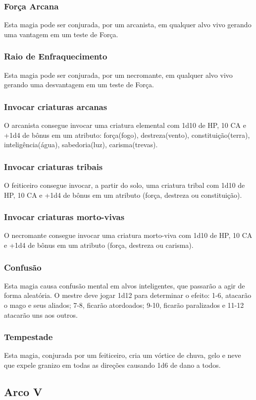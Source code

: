 \documentclass[10pt,twoside,twocolumn]{book}
\begin{document}
\subsubsection*{Força Arcana}
Esta magia pode ser conjurada, por um arcanista, em qualquer alvo vivo gerando uma vantagem em um teste de Força.
\subsubsection*{Raio de Enfraquecimento}
Esta magia pode ser conjurada, por um necromante, em qualquer alvo vivo gerando uma desvantagem em um teste de Força.
\subsubsection*{Invocar criaturas arcanas}
O arcanista consegue invocar uma criatura elemental com 1d10 de HP, 10 CA e +1d4 de bônus em um atributo: força(fogo), destreza(vento), constituição(terra), inteligência(água), sabedoria(luz), carisma(trevas).
\subsubsection*{Invocar criaturas tribais}
O feiticeiro consegue invocar, a partir do solo, uma criatura tribal com 1d10 de HP, 10 CA e +1d4 de bônus em um atributo (força, destreza ou constituição).
\subsubsection*{Invocar criaturas morto-vivas}
O necromante consegue invocar uma criatura morto-viva com 1d10 de HP, 10 CA e +1d4 de bônus em um atributo (força, destreza ou carisma).
\subsubsection*{Confusão}
Esta magia causa confusão mental em alvos inteligentes, que passarão a agir de forma aleatória. O mestre deve jogar 1d12 para determinar o efeito: 1-6, atacarão o mago e seus aliados; 7-8, ficarão atordoados; 9-10, ficarão paralizados e 11-12 atacarão uns aos outros.
\subsubsection*{Tempestade}
Esta magia, conjurada por um feiticeiro, cria um vórtice de chuva, gelo e neve que expele granizo em todas as direções causando 1d6 de dano a todos.

\subsection*{Arco V}
\end{document}

